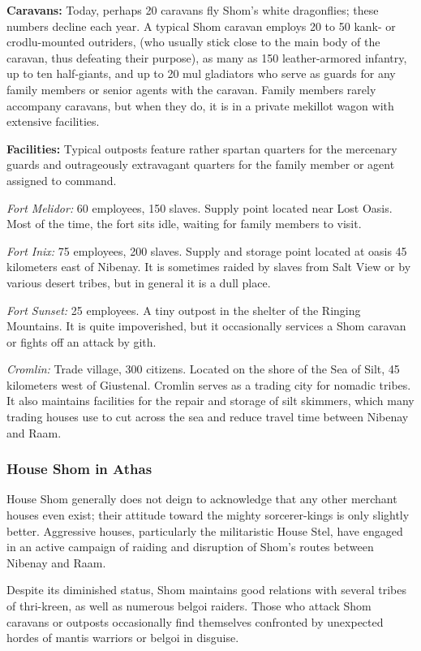 \textbf{Caravans:} Today, perhaps 20 caravans fly Shom's white dragonflies; these numbers decline each year. A typical Shom caravan employs 20 to 50 kank- or crodlu-mounted outriders, (who usually stick close to the main body of the caravan, thus defeating their purpose), as many as 150 leather-armored infantry, up to ten half-giants, and up to 20 mul gladiators who serve as guards for any family members or senior agents with the caravan. Family members rarely accompany caravans, but when they do, it is in a private mekillot wagon with extensive facilities.

\textbf{Facilities:} Typical outposts feature rather spartan quarters for the mercenary guards and outrageously extravagant quarters for the family member or agent assigned to command.

\textit{Fort Melidor:} 60 employees, 150 slaves. Supply point located near Lost Oasis. Most of the time, the fort sits idle, waiting for family members to visit.

\textit{Fort Inix:} 75 employees, 200 slaves. Supply and storage point located at oasis 45 kilometers east of Nibenay. It is sometimes raided by slaves from Salt View or by various desert tribes, but in general it is a dull place.

\textit{Fort Sunset:} 25 employees. A tiny outpost in the shelter of the Ringing Mountains. It is quite impoverished, but it occasionally services a Shom caravan or fights off an attack by gith.

\textit{Cromlin:} Trade village, 300 citizens. Located on the shore of the Sea of Silt, 45 kilometers west of Giustenal. Cromlin serves as a trading city for nomadic tribes. It also maintains facilities for the repair and storage of silt skimmers, which many trading houses use to cut across the sea and reduce travel time between Nibenay and Raam.


\subsubsection{House Shom in Athas}
House Shom generally does not deign to acknowledge that any other merchant houses even exist; their attitude toward the mighty sorcerer-kings is only slightly better. Aggressive houses, particularly the militaristic House Stel, have engaged in an active campaign of raiding and disruption of Shom's routes between Nibenay and Raam.

Despite its diminished status, Shom maintains good relations with several tribes of thri-kreen, as well as numerous belgoi raiders. Those who attack Shom caravans or outposts occasionally find themselves confronted by unexpected hordes of mantis warriors or belgoi in disguise. 

